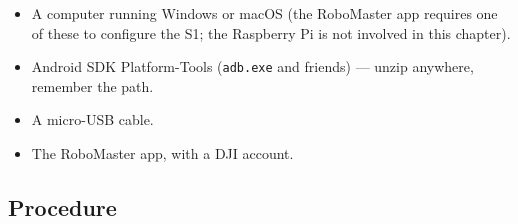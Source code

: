 \documentclass[11pt]{report}
\begin{document}
\begin{itemize}
  \item A computer running Windows or macOS (the RoboMaster app requires
  one of these to configure the S1; the Raspberry Pi is not involved in this
  chapter).
  \item Android SDK Platform-Tools (\texttt{adb.exe} and friends) --- unzip
  anywhere, remember the path.
  \item A micro-USB cable.
  \item The RoboMaster app, with a DJI account.
\end{itemize}

\subsection{Procedure}
\end{document}
